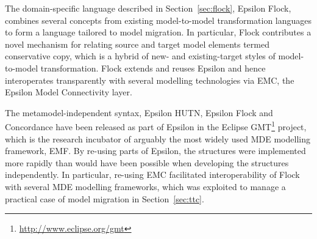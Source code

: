 The domain-specific language described in Section~\ref{sec:flock}, Epsilon Flock, combines several concepts from existing model-to-model transformation languages to form a language tailored to model migration. In particular, Flock contributes a novel mechanism for relating source and target model elements termed conservative copy, which is a hybrid of new- and existing-target styles of model-to-model transformation. Flock extends and reuses  Epsilon and hence interoperates transparently with several modelling technologies via EMC, the Epsilon Model Connectivity layer. 

The metamodel-independent syntax, Epsilon HUTN, Epsilon Flock and Concordance have been released as part of Epsilon in the Eclipse GMT\footnote{\url{http://www.eclipse.org/gmt}} project, which is the research incubator of arguably the most widely used MDE modelling framework, EMF. By re-using parts of Epsilon, the structures were implemented more rapidly than would have been possible when developing the structures independently. In particular, re-using EMC facilitated interoperability of Flock with several MDE modelling frameworks, which was exploited to manage a practical case of model migration in Section~\ref{sec:ttc}.